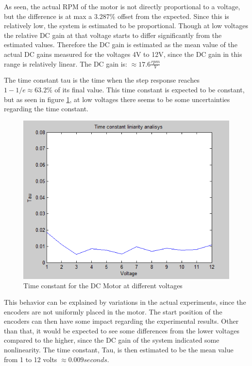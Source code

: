 As seen, the actual RPM of the motor is not directly proportional to a voltage, but the difference is at max a 3.287\% offset from the expected. Since this is relatively low, the system is estimated to be proportional. Though at low voltages the relative DC gain at that voltage starts to differ significantly from the estimated values. Therefore the DC gain is estimated as the mean value of the actual DC gains measured for the voltages 4V to 12V, since the DC gain in this range is relatively linear. The DC gain is: $\approx 17.6\frac{rpm}{V}$

The time constant tau is the time when the step response reaches $1-1/e\approx63.2\%$ of its final value. This time constant is expected to be constant, but as seen in figure \ref{fig:TimeConstantLinearityAnalysis}, at low voltages there seems to be some uncertainties regarding the time constant.

\begin{figure}[h!]
\centering
\includegraphics[scale=0.5]{Billeder/TimeConstantLinearityAnalysis.png}
\caption{Time constant for the DC Motor at different voltages}
\label{fig:TimeConstantLinearityAnalysis}
\end{figure}

This behavior can be explained by variations in the actual experiments, since the encoders are not uniformly placed in the motor. The start position of the encoders can then have some impact regarding the experimental results. Other than that, it would be expected to see some differences from the lower voltages compared to the higher, since the DC gain of the system indicated some nonlinearity. The time constant, Tau, is then estimated to be the mean value from 1 to 12 volts $\approx 0.009 seconds$.

